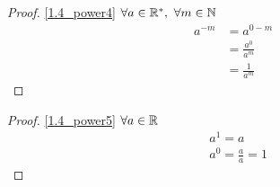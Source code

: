 \begin{proof}
	\ref{1.4_power4} $\forall a \in \mathbb{R}^*,\ \forall m \in \mathbb{N}$
	\begin{align*}
		a^{-m} &= a^{0 - m}  \\
		&= \frac{a^0}{a^m} \\
		&= \frac{1}{a^m}
	\end{align*}
\end{proof}

\begin{proof}
	\ref{1.4_power5} $\forall a \in \mathbb{R}$
	\begin{align*}
		&a^1 = a \\
		&a^0 = \frac{a}{a} = 1
	\end{align*}
\end{proof}
